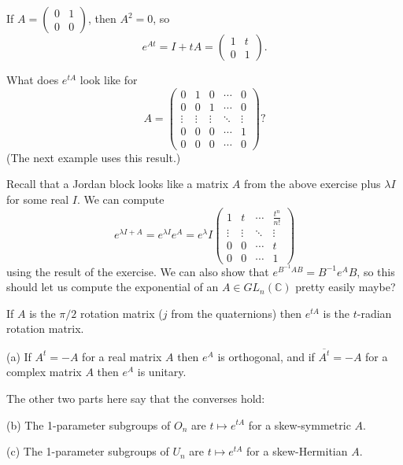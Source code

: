 \documentclass[10pt]{scrartcl}
\providecommand{\ol}{\overline}
\providecommand{\CC}{\mathbb C}
\providecommand{\inv}{^{-1}}
\begin{document}
\begin{example}
	If $A = \begin{pmatrix}
		0&1\\0&0
	\end{pmatrix}$, then $A^2 = 0$, so
	\[e^{At} = I + tA = \begin{pmatrix}
		1&t\\0&1
	\end{pmatrix}.\]
\end{example}

\begin{exercise}
	What does $e^{tA}$ look like for
	\[A = \begin{pmatrix}
		0&1&0&\cdots&0\\
		0&0&1&\cdots&0\\
		\vdots&\vdots&\vdots&\ddots&\vdots\\
		0&0&0&\cdots&1\\
		0&0&0&\cdots&0
	\end{pmatrix}?\]
	(The next example uses this result.)
\end{exercise}

\begin{example}
	Recall that a Jordan block looks like a matrix $A$ from the above exercise
	plus $\lambda I$ for some real $I$. We can compute
	\[e^{\lambda I + A} = e^{\lambda I} e^A = e^\lambda I\begin{pmatrix}
		1&t&\cdots&\frac{t^n}{n!}\\
		\vdots&\vdots&\ddots&\vdots\\
		0&0&\cdots&t\\
		0&0&\cdots&1
	\end{pmatrix}\]
	using the result of the exercise.
	We can also show that $e^{B\inv AB} = B\inv e^AB$,
	so this should let us compute the exponential of an $A\in GL_n(\CC)$
	pretty easily maybe?
\end{example}

\begin{example}
	If $A$ is the $\pi/2$ rotation matrix ($j$ from the quaternions)
	then $e^{tA}$ is the $t$-radian rotation matrix.
\end{example}

\begin{prop}
	(a) If $A^t = -A$ for a real matrix $A$ then $e^A$ is orthogonal,
	and if $\ol{A^t} = -A$ for a complex matrix $A$ then $e^A$ is unitary.
	
	The other two parts here say that the converses hold:
	
	(b) The 1-parameter subgroups of $O_n$ are $t\mapsto e^{tA}$
	for a skew-symmetric $A$.
	
	(c) The 1-parameter subgroups of $U_n$ are $t\mapsto e^{tA}$
	for a skew-Hermitian $A$.
\end{prop}
\end{document}
